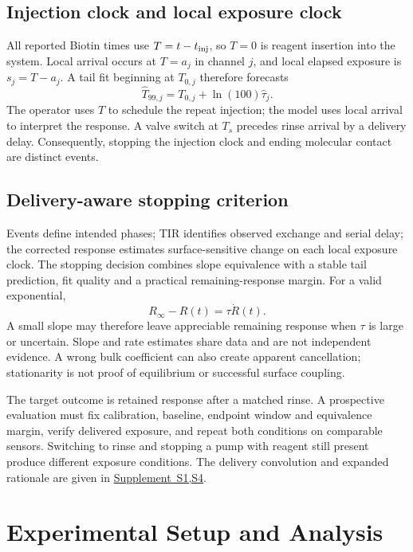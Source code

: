 \documentclass[lettersize,journal]{IEEEtran}
\newcommand{\supp}[1]{\href{SPR_smart_stop_supplement.pdf}{Supplement~#1}}
\begin{document}
\subsection{Injection clock and local exposure clock}
All reported Biotin times use $T=t-t_{\rm inj}$, so $T=0$ is reagent
insertion into the system. Local arrival occurs at $T=a_j$ in channel $j$,
and local elapsed exposure is $s_j=T-a_j$. A tail fit beginning at $T_{0,j}$
therefore forecasts
\begin{equation}\label{eq:commandforecast}
 \widehat T_{99,j}=T_{0,j}+\ln(100)\widehat\tau_j.
\end{equation}
The operator uses $T$ to schedule the repeat injection; the model uses
local arrival to interpret the response. A valve switch at $T_s$ precedes
rinse arrival by a delivery delay. Consequently, stopping the injection
clock and ending molecular contact are distinct events.

\subsection{Delivery-aware stopping criterion}
Events define intended phases; TIR identifies observed exchange and
serial delay; the corrected response estimates surface-sensitive change
on each local exposure clock. The stopping decision combines slope
equivalence with a stable tail prediction, fit quality and a practical
remaining-response margin. For a valid exponential,
\begin{equation}
 R_\infty-R(t)=\tau\dot R(t).
\end{equation}
A small slope may therefore leave appreciable remaining response when
$\tau$ is large or uncertain. Slope and rate estimates share data and are
not independent evidence. A wrong bulk coefficient can also create
apparent cancellation; stationarity is not proof of equilibrium or
successful surface coupling.

The target outcome is retained response after a matched rinse. A
prospective evaluation must fix calibration, baseline, endpoint window
and equivalence margin, verify delivered exposure, and repeat both
conditions on comparable sensors. Switching to rinse and stopping a pump
with reagent still present produce different exposure conditions. The
delivery convolution and expanded rationale are given in \supp{S1,S4}.

\section{Experimental Setup and Analysis}\label{sec:experiment}
\end{document}
